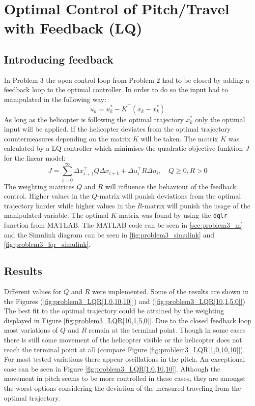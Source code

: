 \section{Optimal Control of Pitch/Travel with Feedback (LQ)}\label{sec:prob3}

\subsection{Introducing feedback}\label{sec:prob31}
In Problem 3 the open control loop from Problem 2 had to be closed by adding a feedback loop to the optimal controller. In order to do so the input had to manipulated in the following way:
\begin{equation}
	u_k=u_k^*-K^\top(x_k-x_k^*)
\end{equation}
As long as the helicopter is following the optimal trajectory $x_k^*$ only the optimal input will be applied. If the helicopter deviates from the optimal trajectory countermeasures depending on the matrix $K$ will be taken. The matrix $K$ was calculated by a LQ controller which minimises the quadratic objective funktion $J$ for the linear model:
\begin{equation}
	J=\displaystyle\sum_{i=0}^{\infty} \Delta x_{i+1}^\top Q \Delta x_{i+1} + \Delta u_i^\top R \Delta u_i, \quad Q \geq 0, R >0
\end{equation}
The weighting matrices $Q$ and $R$ will influence the behaviour of the feedback control. Higher values in the $Q$-matrix will punish deviations from the optimal trajectory harder while higher values in the $R$-matrix will punish the usage of the manipulated variable. The optimal $K$-matrix was found by using the \texttt{dqlr}-function from $\mathrm{MATLAB}$. The MATLAB code can be seen in \cref{sec:problem3_m} and the Simulink diagram can be seen in \cref{fig:problem3_simulink} and \cref{fig:problem3_lqr_simulink}.
\subsection{Results}\label{sec:prob32}
Different values for $Q$ and $R$ were implemented. Some of the results are shown in the Figures (\ref{fig:problem3_LQR[1,0,10,10]}) and (\ref{fig:problem3_LQR[10,1,5,0]}) \\
The best fit to the optimal trajectory could be attained by the weighting displayed in Figure \ref{fig:problem3_LQR[10,1,5,0]}. Due to the closed feedback loop most variations of $Q$ and $R$ remain at the terminal point. Though in some cases there is still some movement of the helicopter visible or the helicopter does not reach the terminal point at all (compare Figure \ref{fig:problem3_LQR[1,0,10,10]}). For most tested variations there appear oscillations in the pitch. An exceptional case can be seen in Figure \ref{fig:problem3_LQR[1,0,10,10]}. Although the movement in pitch seems to be more controlled in these cases, they are amongst the worst options considering the deviation of the measured traveling from the optimal trajectory.

